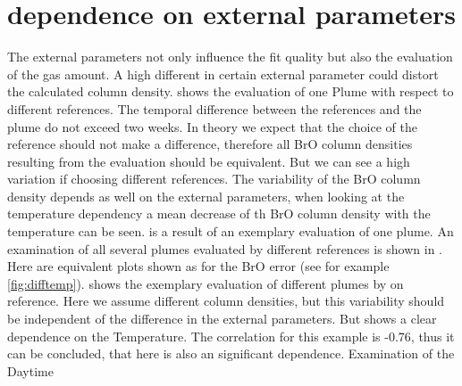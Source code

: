 \documentclass  [
  paper    = a4,
  BCOR     = 10mm,
  twoside,
  fontsize = 12pt,
  fleqn,
  toc      = bibnumbered,
  toc      = listofnumbered,
  numbers  = noendperiod,
  headings = normal,
  listof   = leveldown,
  version  = 3.03
]                                       {scrreprt}
\begin{document}
	\section{  dependence on external parameters}
	The external parameters not only influence the fit quality but also the evaluation of the gas amount. A high different in certain external parameter could distort the calculated   column density.  shows the evaluation of one Plume with respect to different references. The temporal difference between the references and the plume do not exceed two weeks. In theory we expect that the choice of  the reference should not make a difference, therefore all BrO column densities resulting from the evaluation should be equivalent. But we can see a high variation if choosing different references. The variability of the BrO column density depends as well on the external parameters, when looking at the temperature dependency a mean decrease of th BrO column density with the temperature can be seen.  is a result of an exemplary evaluation of one plume. An examination of all several plumes evaluated by different references is shown in . Here are equivalent plots shown as for the BrO error (see for example \cref{fig:difftemp}).  shows the exemplary evaluation of different plumes by on reference. Here we assume different column densities, but this variability should be independent of the difference in the external parameters. But  shows a clear dependence on the Temperature. The correlation for this example is -0.76, thus it can be concluded, that here is also an significant dependence. 
	Examination of the Daytime 
\end{document}
